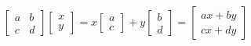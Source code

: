 \documentclass[preview]{standalone}
\begin{document}
\begin{align*}
\begin{bmatrix} a & b \\ c & d \end{bmatrix} \begin{bmatrix} x \\ y \end{bmatrix} = x\begin{bmatrix} a \\ c \end{bmatrix} + y\begin{bmatrix} b \\ d \end{bmatrix} = \begin{bmatrix} ax + by \\ cx + dy \end{bmatrix}
\end{align*}
\end{document}

